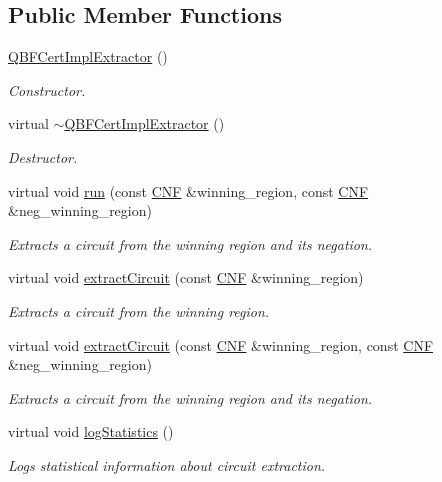 \subsection*{Public Member Functions}
\begin{DoxyCompactItemize}
\item 
\hyperlink{classQBFCertImplExtractor_a1775a11abdad2797b0f7e7e1105bfb2b}{Q\-B\-F\-Cert\-Impl\-Extractor} ()
\begin{DoxyCompactList}\small\item\em Constructor. \end{DoxyCompactList}\item 
virtual \hyperlink{classQBFCertImplExtractor_a52dfc285e9b75484e500b21ff4c35919}{$\sim$\-Q\-B\-F\-Cert\-Impl\-Extractor} ()
\begin{DoxyCompactList}\small\item\em Destructor. \end{DoxyCompactList}\item 
virtual void \hyperlink{classQBFCertImplExtractor_a97cf27d520ea0057385e35bb762a3069}{run} (const \hyperlink{classCNF}{C\-N\-F} \&winning\-\_\-region, const \hyperlink{classCNF}{C\-N\-F} \&neg\-\_\-winning\-\_\-region)
\begin{DoxyCompactList}\small\item\em Extracts a circuit from the winning region and its negation. \end{DoxyCompactList}\item 
virtual void \hyperlink{classCNFImplExtractor_ad329eedd50e443f44edc99db8c2e2613}{extract\-Circuit} (const \hyperlink{classCNF}{C\-N\-F} \&winning\-\_\-region)
\begin{DoxyCompactList}\small\item\em Extracts a circuit from the winning region. \end{DoxyCompactList}\item 
virtual void \hyperlink{classCNFImplExtractor_a5e9694425af3f1a76d8b21ace3c435d9}{extract\-Circuit} (const \hyperlink{classCNF}{C\-N\-F} \&winning\-\_\-region, const \hyperlink{classCNF}{C\-N\-F} \&neg\-\_\-winning\-\_\-region)
\begin{DoxyCompactList}\small\item\em Extracts a circuit from the winning region and its negation. \end{DoxyCompactList}\item 
virtual void \hyperlink{classCNFImplExtractor_aae098749e201b22294a70f6e0a4a58f0}{log\-Statistics} ()
\begin{DoxyCompactList}\small\item\em Logs statistical information about circuit extraction. \end{DoxyCompactList}\end{DoxyCompactItemize}
